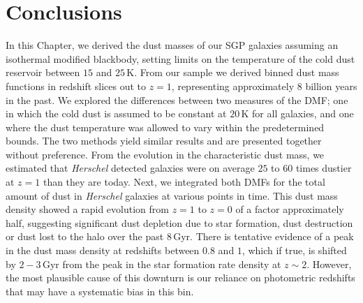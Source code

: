 \section{Conclusions}

In this Chapter, we derived the dust masses of our SGP galaxies assuming an isothermal modified blackbody, setting limits on the temperature of the cold dust reservoir between $15$ and $25\,$K. From our sample we derived binned dust mass functions in redshift slices out to $z = 1$, representing approximately $8$ billion years in the past. We explored the differences between two measures of the DMF; one in which the cold dust is assumed to be constant at $20\,$K for all galaxies, and one where the dust temperature was allowed to vary within the predetermined bounds. The two methods yield similar results and are presented together without preference. From the evolution in the characteristic dust mass, we estimated that \textit{Herschel} detected galaxies were on average $25$ to $60$ times dustier at $z = 1$ than they are today. Next, we integrated both DMFs for the total amount of dust in \textit{Herschel} galaxies at various points in time. This dust mass density showed a rapid evolution from $z = 1$ to $z = 0$ of a factor approximately half, suggesting significant dust depletion due to star formation, dust destruction or dust lost to the halo over the past $8\,$Gyr. There is tentative evidence of a peak in the dust mass density at redshifts between $0.8$ and $1$, which if true, is shifted by $2 - 3\,$Gyr from the peak in the star formation rate density at $z \sim 2$. However, the most plausible cause of this downturn is our reliance on photometric redshifts that may have a systematic bias in this bin.

